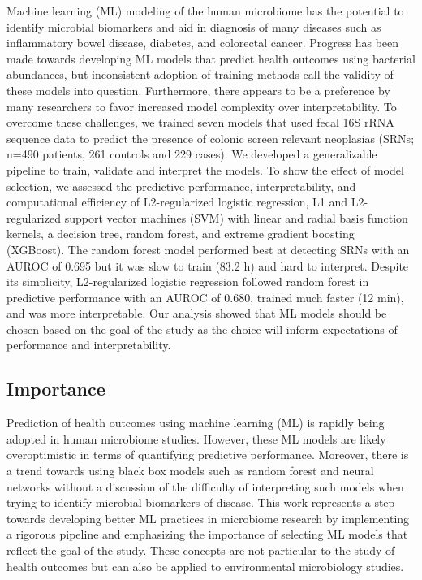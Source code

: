 \documentclass[11pt,]{article}
\begin{document}
Machine learning (ML) modeling of the human microbiome has the potential
to identify microbial biomarkers and aid in diagnosis of many diseases
such as inflammatory bowel disease, diabetes, and colorectal cancer.
Progress has been made towards developing ML models that predict health
outcomes using bacterial abundances, but inconsistent adoption of
training methods call the validity of these models into question.
Furthermore, there appears to be a preference by many researchers to
favor increased model complexity over interpretability. To overcome
these challenges, we trained seven models that used fecal 16S rRNA
sequence data to predict the presence of colonic screen relevant
neoplasias (SRNs; n=490 patients, 261 controls and 229 cases). We
developed a generalizable pipeline to train, validate and interpret the
models. To show the effect of model selection, we assessed the
predictive performance, interpretability, and computational efficiency
of L2-regularized logistic regression, L1 and L2-regularized support
vector machines (SVM) with linear and radial basis function kernels, a
decision tree, random forest, and extreme gradient boosting (XGBoost).
The random forest model performed best at detecting SRNs with an AUROC
of 0.695 but it was slow to train (83.2 h) and hard to interpret.
Despite its simplicity, L2-regularized logistic regression followed
random forest in predictive performance with an AUROC of 0.680, trained
much faster (12 min), and was more interpretable. Our analysis showed
that ML models should be chosen based on the goal of the study as the
choice will inform expectations of performance and interpretability.

\newpage

\subsection{Importance}\label{importance}

Prediction of health outcomes using machine learning (ML) is rapidly
being adopted in human microbiome studies. However, these ML models are
likely overoptimistic in terms of quantifying predictive performance.
Moreover, there is a trend towards using black box models such as random
forest and neural networks without a discussion of the difficulty of
interpreting such models when trying to identify microbial biomarkers of
disease. This work represents a step towards developing better ML
practices in microbiome research by implementing a rigorous pipeline and
emphasizing the importance of selecting ML models that reflect the goal
of the study. These concepts are not particular to the study of health
outcomes but can also be applied to environmental microbiology studies.
\end{document}
